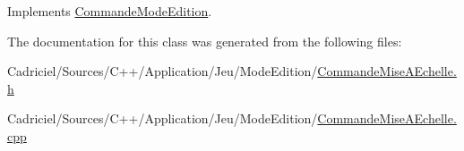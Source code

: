 Implements \hyperlink{class_commande_mode_edition_aca77e9bb8557971af33748041975eecb}{Commande\-Mode\-Edition}.



The documentation for this class was generated from the following files\-:\begin{DoxyCompactItemize}
\item 
Cadriciel/\-Sources/\-C++/\-Application/\-Jeu/\-Mode\-Edition/\hyperlink{_commande_mise_a_echelle_8h}{Commande\-Mise\-A\-Echelle.\-h}\item 
Cadriciel/\-Sources/\-C++/\-Application/\-Jeu/\-Mode\-Edition/\hyperlink{_commande_mise_a_echelle_8cpp}{Commande\-Mise\-A\-Echelle.\-cpp}\end{DoxyCompactItemize}
